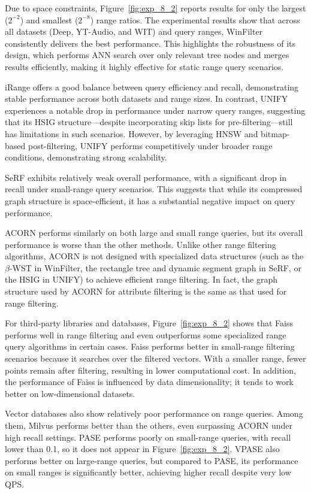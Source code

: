 \documentclass[sigconf, nonacm]{acmart}
\begin{document}
	Due to space constraints, Figure~\ref{fig:exp_8_2} reports results for only the largest ($2^{-2}$) and smallest ($2^{-8}$) range ratios. The experimental results show that across all datasets (Deep, YT-Audio, and WIT) and query ranges, WinFilter consistently delivers the best performance. This highlights the robustness of its design, which performs ANN search over only relevant tree nodes and merges results efficiently, making it highly effective for static range query scenarios.
	
	iRange offers a good balance between query efficiency and recall, demonstrating stable performance across both datasets and range sizes. In contrast, UNIFY experiences a notable drop in performance under narrow query ranges, suggesting that its HSIG structure—despite incorporating skip lists for pre-filtering—still has limitations in such scenarios. However, by leveraging HNSW and bitmap-based post-filtering, UNIFY performs competitively under broader range conditions, demonstrating strong scalability.
	
	SeRF exhibits relatively weak overall performance, with a significant drop in recall under small-range query scenarios. This suggests that while its compressed graph structure is space-efficient, it has a substantial negative impact on query performance.
	
	ACORN performs similarly on both large and small range queries, but its overall performance is worse than the other methods. Unlike other range filtering algorithms, ACORN is not designed with specialized data structures (such as the $\beta$-WST in WinFilter, the rectangle tree and dynamic segment graph in SeRF, or the HSIG in UNIFY) to achieve efficient range filtering. In fact, the graph structure used by ACORN for attribute filtering is the same as that used for range filtering.
	
	For third-party libraries and databases, Figure~\ref{fig:exp_8_2} shows that Faiss performs well in range filtering and even outperforms some specialized range query algorithms in certain cases. Faiss performs better in small-range filtering scenarios because it searches over the filtered vectors. With a smaller range, fewer points remain after filtering, resulting in lower computational cost. In addition, the performance of Faiss is influenced by data dimensionality; it tends to work better on low-dimensional datasets.
	
	Vector databases also show relatively poor performance on range queries. Among them, Milvus performs better than the others, even surpassing ACORN under high recall settings. PASE performs poorly on small-range queries, with recall lower than 0.1, so it does not appear in Figure~\ref{fig:exp_8_2}. VPASE also performs better on large-range queries, but compared to PASE, its performance on small ranges is significantly better, achieving higher recall despite very low QPS.
\end{document}
